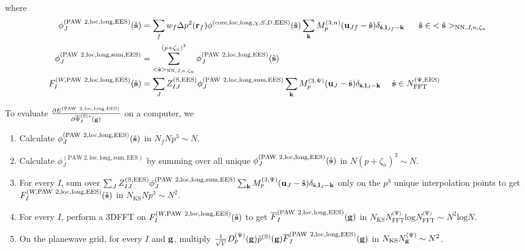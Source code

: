 \documentclass[paper=a4, fontsize=11pt]{article} %
\numberwithin{equation}{section} %
\numberwithin{figure}{section} %
\numberwithin{table}{section} %
\newcommand{\p}{\partial}
\newcommand{\ol}{\overline}
\newcommand{\bu}{{\bf{u}}}
\newcommand{\bl}{{\bf{l}}}
\newcommand{\bk}{{\bf{k}}}
\newcommand{\bs}{{\bf{s}}}
\newcommand{\bg}{{\bf{g}}}
\newcommand{\br}{{\bf{r}}}
\newcommand{\hs}{{\hat{\bf{s}}}}
\newcommand{\rS}{{\mathrm{S}}}
\newcommand{\rEES}{{\mathrm{EES}}}
\newcommand{\rcore}{{\mathrm{core}}}
\newcommand{\rNN}{{\mathrm{NN}}}
\newcommand{\rlong}{{\mathrm{long}}}
\newcommand{\rP}{{\mathrm{PAW}}}
\newcommand{\rsum}{{\mathrm{sum}}}
\newcommand{\rlo}{{\mathrm{loc}}}
\newcommand{\rl}{{\mathrm{log}}}
\newcommand{\psigsc}{{\overline \Psi_I^{(\rS)*}(\bg)}}
\newcommand{\NKS}{{N_{\mathrm{KS}}}}
\newcommand{\NFFTp}{{N^{\mathrm{(\Psi})}_{\mathrm{FFT}}}}
\newcommand{\NFFTpEES}{{N^{\mathrm{(\Psi,\rEES})}_{\mathrm{FFT}}}}
\newcommand{\NgKS}{{N^{\mathrm{(\Psi})}_\bg}}
\newcommand{\Dpg}{{D^{(\Psi)}_p(\bg)}}
\newcommand{\Mp}{{M_p^{(3,\Psi)}}}
\newcommand{\pzn}{{(p+\zeta_n)^3}}
\newcommand{\hsJn}{{<\hs>_{\rNN,J,n,\zeta_n}}}
\newcommand{\hsinJn}{{\ \ \ \ \ \hs  \in  \hsJn}}
\newcommand{\hsinpEES}{{\ \ \ \ \hs \in \NFFTpEES}}
\begin{document}
where
\begin{equation}
\begin{split}
\phi_J^{(\rP\ 2,\rlo,\rlong,\rEES)}(\hs) &= \sum_f w_f \Delta p^2(\br_f) \phi^{(\rcore,\rlo,\rlong,\chi,S,D,\rEES)}(\hs) \sum_{\bk}  M_p^{(3,n)}(\bu_{Jf}-\hat \bs)\delta_{\hat \bs,\bl_{Jf}-\bk} \hsinJn\\
\phi_J^{(\rP\ 2,\rlo,\rlong,\rsum,\rEES)} &= \sum_{\hsJn}^{\pzn} \phi_J^{(\rP\ 2,\rlo,\rlong,\rEES)}(\hs)\\
F_I^{(W,\rP\ 2,\rlo,\rlong,\rEES)}(\hs) &= \sum_J Z_{IJ}^{(\rS,\rEES)}  \phi_J^{(\rP\ 2,\rlo,\rlong,\rsum,\rEES)}\sum_{\bk} \Mp(\bu_{J}-\hat \bs) \delta_{\hat \bs,\bl_J-\bk} \hsinpEES \\
\end{split}
\end{equation}


To evaluate $\frac{\p E^{(\rP\ 2,\rlo,\rlong,\rEES)}}{ \p \psigsc}$ on a computer, we
\begin{enumerate}
\item Calculate $\phi_J^{(\rP\ 2,\rlo,\rlong,\rEES)}(\hs)$ in $N_f N p^3 \sim N$.
\item Calculate $\phi_J^{(\rP\ 2,\rlo,\rlong,\rsum,\rEES)}$ by summing over all unique $\phi_J^{(\rP\ 2,\rlo,\rlong,\rEES)}(\hs)$ in $N \pzn \sim N$.
\item For every $I$, sum over $\sum_J Z_{IJ}^{(\rS,\rEES)}  \phi_J^{(\rP\ 2,\rlo,\rlong,\rsum,\rEES)}\sum_{\bk} \Mp(\bu_{J}-\hat \bs) \delta_{\hat \bs,\bl_J-\bk}$ only on the $p^3$ unique interpolation points to get $F_I^{(W,\rP\ 2,\rlo,\rlong,\rEES)}(\hs)$ in $\NKS N p^3 \sim N^2$.
\item For every $I$, perform a 3DFFT on $F_I^{(W,\rP\ 2,\rlo,\rlong,\rEES)}(\hs)$ to get $\ol F_I^{(\rP\ 2,\rlo,\rlong,\rEES)}(\bg)$ in $\NKS \NFFTp \rl \NFFTp \sim N^2 \rl N$.
\item On the planewave grid, for every $I$ and $\bg$, multiply $\frac{1}{\sqrt{V}} \Dpg \tilde p^{(\rS)}(\bg) \ol F_I^{(\rP\ 2,\rlo,\rlong,\rEES)}(\bg)$ in $\NKS \NgKS \sim N^2$.
\end{enumerate}
\end{document}
